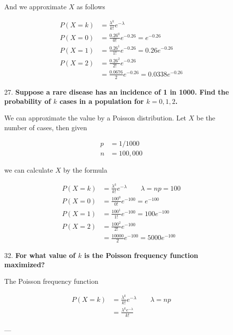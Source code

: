 \documentclass{article}
\begin{document}
\begin{enumerate}
			And we approximate $X$ as follows
	
				\begin{align*}
					P(X = k) & = \frac{\lambda^k}{k!}e^{-\lambda}\\
					P(X = 0) & = \frac{0.26^0}{0!}e^{-0.26} = e^{-0.26} \\
					P(X = 1) & = \frac{0.26^1}{1!}e^{-0.26} = 0.26e^{-0.26} \\
					P(X = 2) & = \frac{0.26^2}{2!}e^{-0.26} \\
							 & = \frac{0.0676}{2}e^{-0.26} = 0.0338e^{-0.26}
				\end{align*}

		\item [27.]	\textbf{Suppose a rare disease has an incidence of 1 in 1000. Find the 
						probability of $k$ cases in a population for $k = 0, 1, 2$.}

			We can approximate the value by a Poisson distribution. Let $X$ be the number of cases,
			then given

				\begin{align*}
					p & = 1 / 1000 \\
					n & = 100,000
				\end{align*}	

			we can calculate $X$ by the formula

				\begin{align*}
					P(X = k) & = \frac{\lambda^k}{k!}e^{-\lambda} \qquad \lambda = np = 100 \\
					P(X = 0) & = \frac{100^0}{0!}e^{-100} = e^{-100} \\
					P(X = 1) & = \frac{100^1}{1!}e^{-100} = 100e^{-100} \\
					P(X = 2) & = \frac{100^2}{2!}e^{-100} \\
							 & = \frac{10000}{2}e^{-100} = 5000e^{-100}
				\end{align*}

		\item [32.]	\textbf{For what value of $k$ is the Poisson frequency function maximized?}
		
			The Poisson frequency function 

				\begin{align*}
					P(X = k) & = \frac{\lambda^k}{k!}e^{-\lambda} \qquad \lambda = np \\
						& = \frac{\lambda^ke^{-\lambda}}{k!}
				\end{align*}

			---

	\end{enumerate}
\end{document}
